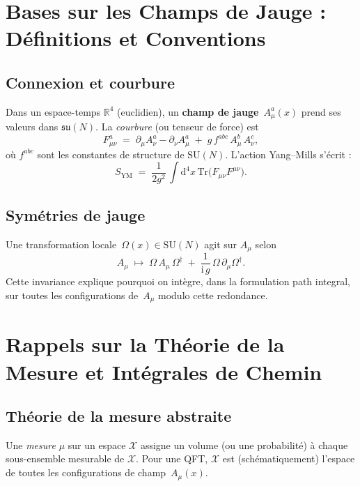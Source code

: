 \vspace{1em}

\section{Bases sur les Champs de Jauge : Définitions et Conventions}
\label{sec:A.2}

\subsection*{Connexion et courbure}
Dans un espace-temps \(\mathbb{R}^4\) (euclidien), un \textbf{champ de jauge} \(\,A_\mu^a(x)\) prend ses valeurs dans \(\mathfrak{su}(N)\). La \emph{courbure} (ou tenseur de force) est
\[
F_{\mu\nu}^a \;=\; \partial_\mu A_\nu^a - \partial_\nu A_\mu^a \;+\; g\,f^{abc}\,A_\mu^b\,A_\nu^c,
\]
où \(f^{abc}\) sont les constantes de structure de \(\mathrm{SU}(N)\). L’action Yang--Mills s’écrit :
\[
S_{\mathrm{YM}} \;=\; \frac{1}{2g^2}\,\int \mathrm{d}^4x\, \mathrm{Tr}\bigl(F_{\mu\nu}F^{\mu\nu}\bigr).
\]

\subsection*{Symétries de jauge}
Une transformation locale \(\,\Omega(x)\in \mathrm{SU}(N)\) agit sur \(A_\mu\) selon
\[
A_\mu \;\mapsto\; \Omega\,A_\mu\,\Omega^\dagger \;+\; \frac{1}{\mathrm{i}\,g}\,\Omega\,\partial_\mu\Omega^\dagger.
\]
Cette invariance explique pourquoi on intègre, dans la formulation path integral, sur toutes les configurations de \(\,A_\mu\) modulo cette redondance.

\vspace{1em}

\section{Rappels sur la Théorie de la Mesure et Intégrales de Chemin}
\label{sec:A.3}

\subsection*{Théorie de la mesure abstraite}
Une \emph{mesure} \(\mu\) sur un espace \(\mathcal{X}\) assigne un volume (ou une probabilité) à chaque sous-ensemble mesurable de \(\mathcal{X}\). Pour une QFT, \(\mathcal{X}\) est (schématiquement) l’espace de toutes les configurations de champ \(\,A_\mu(x)\).


